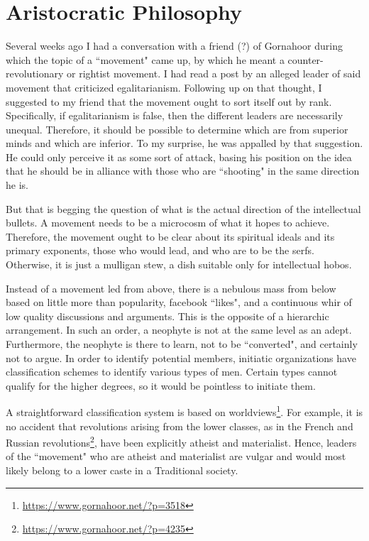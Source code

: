 \section{Aristocratic Philosophy}

Several weeks ago I had a conversation with a friend (?) of Gornahoor during which the topic of a ``movement" came up, by which he meant a counter-revolutionary or rightist movement. I had read a post by an alleged leader of said movement that criticized egalitarianism. Following up on that thought, I suggested to my friend that the movement ought to sort itself out by rank. Specifically, if egalitarianism is false, then the different leaders are necessarily unequal. Therefore, it should be possible to determine which are from superior minds and which are inferior. To my surprise, he was appalled by that suggestion. He could only perceive it as some sort of attack, basing his position on the idea that he should be in alliance with those who are ``shooting" in the same direction he is.

But that is begging the question of what is the actual direction of the intellectual bullets. A movement needs to be a microcosm of what it hopes to achieve. Therefore, the movement ought to be clear about its spiritual ideals and its primary exponents, those who would lead, and who are to be the serfs. Otherwise, it is just a mulligan stew, a dish suitable only for intellectual hobos.

Instead of a movement led from above, there is a nebulous mass from below based on little more than popularity, facebook ``likes", and a continuous whir of low quality discussions and arguments. This is the opposite of a hierarchic arrangement. In such an order, a neophyte is not at the same level as an adept. Furthermore, the neophyte is there to learn, not to be ``converted", and certainly not to argue. In order to identify potential members, initiatic organizations have classification schemes to identify various types of men. Certain types cannot qualify for the higher degrees, so it would be pointless to initiate them.

A straightforward classification system is based on worldviews\footnote{\url{https://www.gornahoor.net/?p=3518}}. For example, it is no accident that revolutions arising from the lower classes, as in the French and Russian revolutions\footnote{\url{https://www.gornahoor.net/?p=4235}}, have been explicitly atheist and materialist. Hence, leaders of the ``movement" who are atheist and materialist are vulgar and would most likely belong to a lower caste in a Traditional society.

